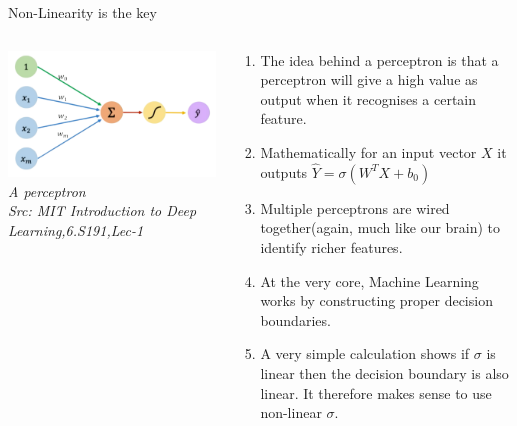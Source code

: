 \begin{frame}{Non-Linearity is the key}
  \begin{columns}[T]
  \begin{column}{0.4\textwidth}
    \includegraphics[width=\textwidth]{images/nobg perceptron.png}
    \tiny{\textit{A perceptron\\ Src: MIT Introduction to Deep Learning,6.S191,Lec-1}}
  \end{column}
  \begin{column}{0.6\textwidth}
  \begin{enumerate}[$\bullet$]
  \item The idea behind a perceptron is that a perceptron will give a high value as output when it recognises a certain feature.\pause
  \item Mathematically for an input vector $X$ it outputs $\hat{Y}=\sigma(W^TX+b_0)$ \pause
  \item Multiple perceptrons are wired together(again, much like our brain) to identify richer features.\pause
  \item At the very core, Machine Learning works by constructing proper decision boundaries.\pause
  \item A very simple calculation shows if $\sigma$ is linear then the decision boundary is also linear. It therefore makes sense to use non-linear $\sigma$.
  \end{enumerate}
  \end{column}
\end{columns}
\end{frame}


